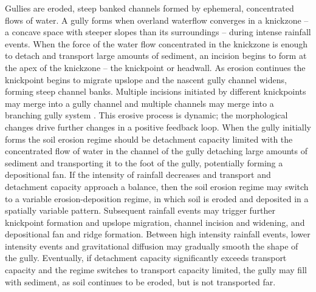 \documentclass[gmd, manuscript]{copernicus}
\begin{document}
Gullies are eroded, steep banked channels 
formed by ephemeral, concentrated flows of water.
A gully forms when overland waterflow
converges in a knickzone
-- a concave space with steeper slopes than its surroundings 
\citep{Zahra2017} -- 
during intense rainfall events.  
When the force of the water flow concentrated in the knickzone
is enough to detach and transport large amounts of sediment,
an incision begins to form at the apex of the knickzone 
-- the knickpoint or headwall.
As erosion continues the knickpoint begins to migrate upslope
and the nascent gully channel widens,
forming steep channel banks. 
Multiple incisions initiated by different knickpoints 
may merge into a gully channel
and multiple channels may merge 
into a branching gully system \citep{Mitasova2013}. 
This erosive process is dynamic; 
the morphological changes drive further changes 
in a positive feedback loop.
When the gully initially forms 
the soil erosion regime should be detachment capacity limited
with the concentrated flow of water in the channel of the gully 
detaching large amounts of sediment 
and transporting it to the foot of the gully, 
potentially forming a depositional fan.
If the intensity of rainfall decreases
and transport and detachment capacity 
approach a balance, 
then the soil erosion regime may switch to 
a variable erosion-deposition regime,
in which soil is eroded and deposited 
in a spatially variable pattern.
Subsequent rainfall events may trigger further 
knickpoint formation and upslope migration, 
channel incision and widening, and
depositional fan and ridge formation. 
Between high intensity rainfall events, 
lower intensity events and gravitational diffusion
may gradually smooth the shape of the gully. 
Eventually, if detachment capacity 
significantly exceeds transport capacity
and the regime switches to transport capacity limited, 
the gully may fill with sediment,
as soil continues to be eroded, but is not transported far. 
\end{document}

